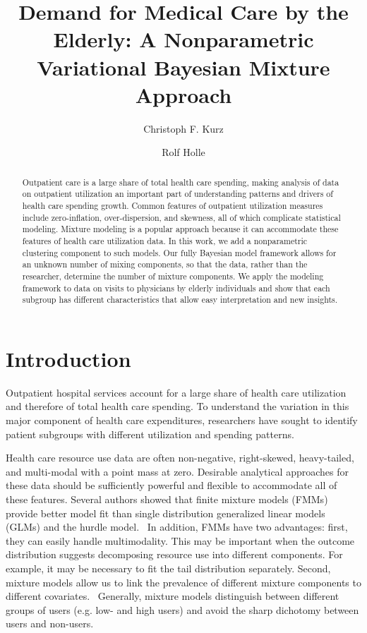 \documentclass[a4paper,UKenglish]{oasics}
\title{Demand for Medical Care by the Elderly: A Nonparametric Variational Bayesian Mixture	Approach}
\author[1]{Christoph F. Kurz}
\author[1]{Rolf Holle}
\affil[1]{Helmholtz Zentrum M\"unchen,\\
  Institute of Health Economics and Health Care Management, Neuherberg, Germany\\
  \texttt{christoph.kurz@helmholtz-muenchen.de}}
\begin{document}
\maketitle

\begin{abstract}
Outpatient care is a large share of total health care spending, making analysis of data on outpatient utilization an important part of understanding patterns and drivers of health care spending growth. Common features of outpatient utilization measures include zero-inflation, over-dispersion, and skewness, all of which complicate statistical modeling. Mixture modeling is a popular approach because it can accommodate these features of health care utilization data. In this work, we add a nonparametric clustering component to such models. Our fully Bayesian model framework allows for an unknown number of mixing components, so that the data, rather than the researcher, determine the number of mixture components. We apply the modeling framework to data on visits to physicians by elderly individuals and show that each subgroup has different characteristics that allow easy interpretation and new insights.
\end{abstract}

\section{Introduction}
Outpatient hospital services account for a large share of health care utilization and therefore of total health care spending. To understand the variation in this major component of health care expenditures, researchers have sought to identify patient subgroups with different utilization and spending patterns.

Health care resource use data are often non-negative, right-skewed, heavy-tailed, and multi-modal with a point mass at zero. Desirable analytical approaches for these data should be sufficiently powerful and flexible to accommodate all of these features.
Several authors showed that finite mixture models (FMMs) provide better model fit than single distribution generalized linear models (GLMs) and the hurdle model.~\cite{DebTrivedi, mihaylova} In addition, FMMs have two advantages: first,
they can easily handle multimodality. This may be important when the outcome distribution suggests decomposing resource use into different components.
For example, it may be necessary to fit the tail distribution separately. Second, mixture models allow us to link the prevalence of different mixture components to different covariates.~\cite{mihaylova} Generally, mixture models distinguish between different groups of users (e.g. low- and high users) and avoid the sharp dichotomy between users and non-users.
\end{document}
